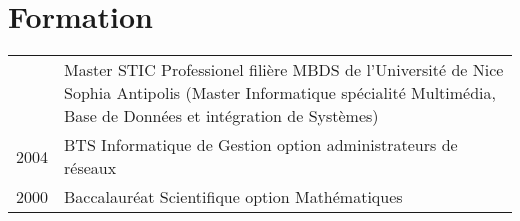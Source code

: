 \section{\texorpdfstring{\color{Blue}Formation}{Formation}}
\begin{tabular}{>{\small}r>{\small}p{14cm}}
 \parbox{\datebox}{} & Master STIC Professionel filière MBDS
 de l'Université de Nice Sophia Antipolis (Master Informatique spécialité Multimédia, Base de Données et
 intégration de Systèmes) \\ 
 2004 & BTS Informatique de Gestion option administrateurs de réseaux \\
 2000 & Baccalauréat Scientifique option Mathématiques
\end{tabular}